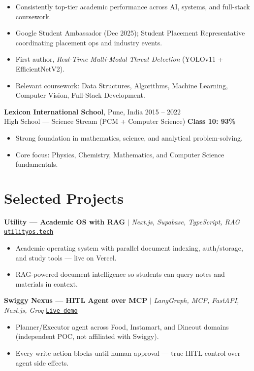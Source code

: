 \documentclass[a4paper,10pt]{article}
\begin{document}
\begin{itemize}
  \item Consistently top-tier academic performance across AI, systems, and full-stack coursework.
  \item Google Student Ambassador (Dec 2025); Student Placement Representative coordinating placement ops and industry events.
  \item First author, \textit{Real-Time Multi-Modal Threat Detection} (YOLOv11 + EfficientNetV2).
  \item Relevant coursework: Data Structures, Algorithms, Machine Learning, Computer Vision, Full-Stack Development.
\end{itemize}

\vspace{6pt}
\noindent
\textbf{Lexicon International School}, Pune, India \hfill 2015 -- 2022\\[2pt]
High School --- Science Stream (PCM + Computer Science) \hfill {\large\bfseries Class 10: 93\%}
\begin{itemize}
  \item Strong foundation in mathematics, science, and analytical problem-solving.
  \item Core focus: Physics, Chemistry, Mathematics, and Computer Science fundamentals.
\end{itemize}

\section*{Selected Projects}

\noindent
\textbf{Utility --- Academic OS with RAG} $|$ \textit{Next.js, Supabase, TypeScript, RAG}
\hfill \texttt{\href{https://utilityos.tech}{utilityos.tech}}
\begin{itemize}
  \item Academic operating system with parallel document indexing, auth/storage, and study tools --- live on Vercel.
  \item RAG-powered document intelligence so students can query notes and materials in context.
\end{itemize}

\vspace{5pt}
\noindent
\textbf{Swiggy Nexus --- HITL Agent over MCP} $|$ \textit{LangGraph, MCP, FastAPI, Next.js, Groq}
\hfill \texttt{\href{https://swiggy-nexus.vercel.app/}{Live demo}}
\begin{itemize}
  \item Planner/Executor agent across Food, Instamart, and Dineout domains (independent POC, not affiliated with Swiggy).
  \item Every write action blocks until human approval --- true HITL control over agent side effects.
\end{itemize}
\end{document}

